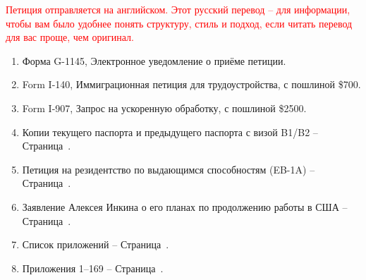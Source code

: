 \textcolor{red}{\Large%
    Петиция отправляется на английском.
    Этот русский перевод -- для информации,
    чтобы вам было удобнее понять структуру, стиль и подход,
    если читать перевод для вас проще, чем оригинал.%
}


\begin{enumerate}
    \item Форма G-1145, Электронное уведомление о приёме петиции.
    \item Form I-140, Иммиграционная петиция для трудоустройства, с пошлиной \$700.
    \item Form I-907, Запрос на ускоренную обработку, с пошлиной \$2500.
    \item Копии текущего паспорта и предыдущего паспорта с визой B1/B2 -- Страница~\pageref{Passport}.
    \item Петиция на резидентство по выдающимся способностям (EB-1A) -- Страница~\pageref{Body}.
    \item Заявление Алексея Инкина о его планах по продолжению работы в США -- Страница~\pageref{WorkPlan}.
    \item Список приложений -- Страница~\pageref{ListOfExhibits}.
    \item Приложения 1--169 -- Страница~\pageref{Exhibits}. %
\end{enumerate}

\pagebreak
